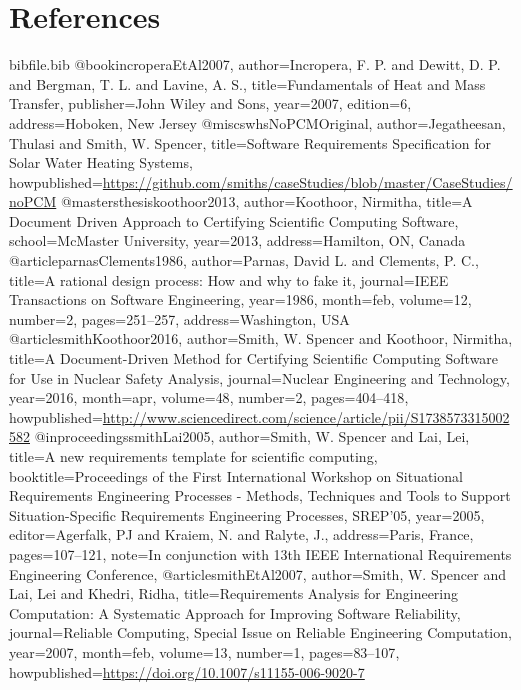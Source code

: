 \documentclass[12pt]{article}
\begin{document}
\section{References}
\label{Sec:References}
\begin{filecontents*}{bibfile.bib}
@book{incroperaEtAl2007,
author={Incropera, F. P. and Dewitt, D. P. and Bergman, T. L. and Lavine, A. S.},
title={Fundamentals of Heat and Mass Transfer},
publisher={John Wiley and Sons},
year={2007},
edition={6},
address={Hoboken, New Jersey}}
@misc{swhsNoPCMOriginal,
author={Jegatheesan, Thulasi and Smith, W. Spencer},
title={Software Requirements Specification for Solar Water Heating Systems},
howpublished={\url{https://github.com/smiths/caseStudies/blob/master/CaseStudies/noPCM}}}
@mastersthesis{koothoor2013,
author={Koothoor, Nirmitha},
title={A Document Driven Approach to Certifying Scientific Computing Software},
school={McMaster University},
year={2013},
address={Hamilton, ON, Canada}}
@article{parnasClements1986,
author={Parnas, David L. and Clements, P. C.},
title={A rational design process: How and why to fake it},
journal={IEEE Transactions on Software Engineering},
year={1986},
month=feb,
volume={12},
number={2},
pages={251--257},
address={Washington, USA}}
@article{smithKoothoor2016,
author={Smith, W. Spencer and Koothoor, Nirmitha},
title={A Document-Driven Method for Certifying Scientific Computing Software for Use in Nuclear Safety Analysis},
journal={Nuclear Engineering and Technology},
year={2016},
month=apr,
volume={48},
number={2},
pages={404--418},
howpublished={\url{http://www.sciencedirect.com/science/article/pii/S1738573315002582}}}
@inproceedings{smithLai2005,
author={Smith, W. Spencer and Lai, Lei},
title={A new requirements template for scientific computing},
booktitle={Proceedings of the First International Workshop on Situational Requirements Engineering Processes - Methods, Techniques and Tools to Support Situation-Specific Requirements Engineering Processes, SREP'05},
year={2005},
editor={Agerfalk, PJ and Kraiem, N. and Ralyte, J.},
address={Paris, France},
pages={107--121},
note={In conjunction with 13th IEEE International Requirements Engineering Conference,}}
@article{smithEtAl2007,
author={Smith, W. Spencer and Lai, Lei and Khedri, Ridha},
title={Requirements Analysis for Engineering Computation: A Systematic Approach for Improving Software Reliability},
journal={Reliable Computing, Special Issue on Reliable Engineering Computation},
year={2007},
month=feb,
volume={13},
number={1},
pages={83--107},
howpublished={\url{https://doi.org/10.1007/s11155-006-9020-7}}}
\end{filecontents*}
\nocite{*}
\printbibliography[heading=none]
\end{document}
